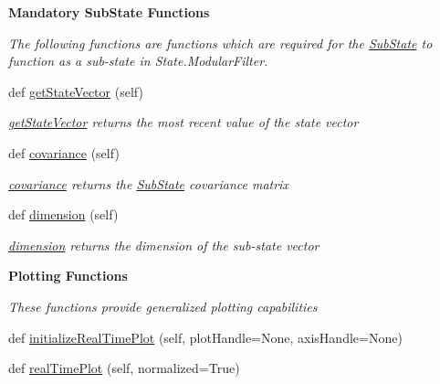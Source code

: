\begin{Indent}{\bf Mandatory Sub\+State Functions}\par
{\em The following functions are functions which are required for the \hyperlink{namespacemodest_1_1substates_1_1SubState}{Sub\+State} to function as a sub-\/state in State.\+Modular\+Filter. }\begin{DoxyCompactItemize}
\item 
def \hyperlink{classmodest_1_1substates_1_1SubState_1_1SubState_a26146efb15c1d33fee433df4725bae45}{get\+State\+Vector} (self)
\begin{DoxyCompactList}\small\item\em \hyperlink{classmodest_1_1substates_1_1SubState_1_1SubState_a26146efb15c1d33fee433df4725bae45}{get\+State\+Vector} returns the most recent value of the state vector \end{DoxyCompactList}\item 
def \hyperlink{classmodest_1_1substates_1_1SubState_1_1SubState_af77dd1cc9f3c6cc9e5619a2f56ca0cdd}{covariance} (self)
\begin{DoxyCompactList}\small\item\em \hyperlink{classmodest_1_1substates_1_1SubState_1_1SubState_af77dd1cc9f3c6cc9e5619a2f56ca0cdd}{covariance} returns the \hyperlink{classmodest_1_1substates_1_1SubState_1_1SubState}{Sub\+State} covariance matrix \end{DoxyCompactList}\item 
def \hyperlink{classmodest_1_1substates_1_1SubState_1_1SubState_aaf7473d2ebcd61adf1b7bb2262eb31d1}{dimension} (self)
\begin{DoxyCompactList}\small\item\em \hyperlink{classmodest_1_1substates_1_1SubState_1_1SubState_aaf7473d2ebcd61adf1b7bb2262eb31d1}{dimension} returns the dimension of the sub-\/state vector \end{DoxyCompactList}\end{DoxyCompactItemize}
\end{Indent}
\begin{Indent}{\bf Plotting Functions}\par
{\em These functions provide generalized plotting capabilities }\begin{DoxyCompactItemize}
\item 
def \hyperlink{classmodest_1_1substates_1_1SubState_1_1SubState_a89c6eb66130203ad0351e94fad3de11d}{initialize\+Real\+Time\+Plot} (self, plot\+Handle=None, axis\+Handle=None)
\item 
def \hyperlink{classmodest_1_1substates_1_1SubState_1_1SubState_a1efb0a32eb2bedc017e4fe190c57976e}{real\+Time\+Plot} (self, normalized=True)
\end{DoxyCompactItemize}
\end{Indent}
